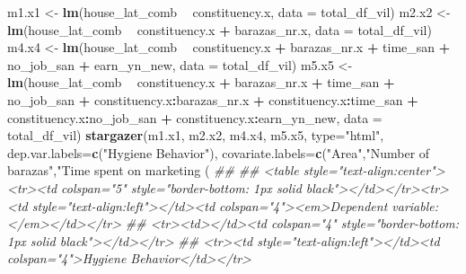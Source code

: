 \documentclass[
]{article}
\newenvironment{Shaded}{\begin{snugshade}}{\end{snugshade}}
\newcommand{\CommentTok}[1]{\textcolor[rgb]{0.56,0.35,0.01}{\textit{#1}}}
\newcommand{\DataTypeTok}[1]{\textcolor[rgb]{0.13,0.29,0.53}{#1}}
\newcommand{\FloatTok}[1]{\textcolor[rgb]{0.00,0.00,0.81}{#1}}
\newcommand{\KeywordTok}[1]{\textcolor[rgb]{0.13,0.29,0.53}{\textbf{#1}}}
\newcommand{\NormalTok}[1]{#1}
\newcommand{\OperatorTok}[1]{\textcolor[rgb]{0.81,0.36,0.00}{\textbf{#1}}}
\newcommand{\OtherTok}[1]{\textcolor[rgb]{0.56,0.35,0.01}{#1}}
\newcommand{\StringTok}[1]{\textcolor[rgb]{0.31,0.60,0.02}{#1}}
\begin{document}
\begin{Shaded}
\begin{Highlighting}[]
{{{{{{{{{{{{{{{{\NormalTok{m1.x1 <-}\StringTok{ }\KeywordTok{lm}\NormalTok{(house_lat_comb }\OperatorTok{~}\StringTok{ }\NormalTok{constituency.x,}
            \DataTypeTok{data =}\NormalTok{ total_df_vil)}
\NormalTok{m2.x2 <-}\StringTok{ }\KeywordTok{lm}\NormalTok{(house_lat_comb }\OperatorTok{~}\StringTok{ }\NormalTok{constituency.x }\OperatorTok{+}\StringTok{ }\NormalTok{barazas_nr.x,}
            \DataTypeTok{data =}\NormalTok{ total_df_vil)}
\NormalTok{m4.x4 <-}\StringTok{ }\KeywordTok{lm}\NormalTok{(house_lat_comb }\OperatorTok{~}\StringTok{ }\NormalTok{constituency.x }\OperatorTok{+}\StringTok{ }\NormalTok{barazas_nr.x }\OperatorTok{+}\StringTok{ }\NormalTok{time_san }\OperatorTok{+}\StringTok{ }\NormalTok{no_job_san }\OperatorTok{+}\StringTok{ }\NormalTok{earn_yn_new,}
            \DataTypeTok{data =}\NormalTok{ total_df_vil)}
\NormalTok{m5.x5 <-}\StringTok{ }\KeywordTok{lm}\NormalTok{(house_lat_comb }\OperatorTok{~}\StringTok{ }\NormalTok{constituency.x }\OperatorTok{+}\StringTok{ }\NormalTok{barazas_nr.x }\OperatorTok{+}\StringTok{ }\NormalTok{time_san }\OperatorTok{+}\StringTok{ }\NormalTok{no_job_san }\OperatorTok{+}\StringTok{ }\NormalTok{constituency.x}\OperatorTok{:}\NormalTok{barazas_nr.x }\OperatorTok{+}\StringTok{ }\NormalTok{constituency.x}\OperatorTok{:}\NormalTok{time_san }\OperatorTok{+}\StringTok{ }\NormalTok{constituency.x}\OperatorTok{:}\NormalTok{no_job_san }\OperatorTok{+}\StringTok{ }\NormalTok{constituency.x}\OperatorTok{:}\NormalTok{earn_yn_new,}
            \DataTypeTok{data =}\NormalTok{ total_df_vil)}
\KeywordTok{stargazer}\NormalTok{(m1.x1, m2.x2, m4.x4, m5.x5, }\DataTypeTok{type=}\StringTok{"html"}\NormalTok{,}
          \DataTypeTok{dep.var.labels=}\KeywordTok{c}\NormalTok{(}\StringTok{"Hygiene Behavior"}\NormalTok{),}
          \DataTypeTok{covariate.labels=}\KeywordTok{c}\NormalTok{(}\StringTok{"Area"}\NormalTok{,}\StringTok{"Number of barazas"}\NormalTok{,}\StringTok{"Time spent on marketing (%)"}\NormalTok{,}\StringTok{"Main job"}\NormalTok{, }\StringTok{"Earnings"}\NormalTok{), }\DataTypeTok{ci=}\OtherTok{TRUE}\NormalTok{, }\DataTypeTok{ci.level=}\FloatTok{0.95}\NormalTok{, }\DataTypeTok{out=}\StringTok{"modelsIndiviInteraction100.htm"}\NormalTok{)}
\CommentTok{## }
\CommentTok{## <table style="text-align:center"><tr><td colspan="5" style="border-bottom: 1px solid black"></td></tr><tr><td style="text-align:left"></td><td colspan="4"><em>Dependent variable:</em></td></tr>}
\CommentTok{## <tr><td></td><td colspan="4" style="border-bottom: 1px solid black"></td></tr>}
\CommentTok{## <tr><td style="text-align:left"></td><td colspan="4">Hygiene Behavior</td></tr>}
}}}}}}}}}}}}}}}}}
\end{Highlighting}
\end{Shaded}
\end{document}

